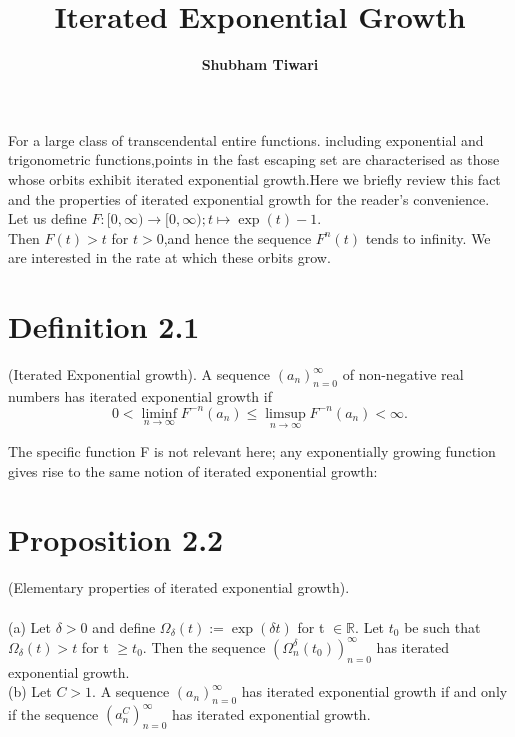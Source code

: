\documentclass{article}
\title{\textbf{Iterated Exponential Growth}}
\author{\textbf{Shubham Tiwari}}
\date{}
\begin{document}
\maketitle
For a large class of transcendental entire functions. including exponential and trigonometric functions,points in the fast escaping set are characterised as those whose orbits exhibit iterated exponential growth.Here we briefly review this fact and the properties of iterated exponential growth for the reader's convenience.\\
\vspace{0.5cm}
Let us define $ F \colon [0,\infty) \to [0,\infty) ; t \mapsto \exp(t) -1$. \\
Then $F(t) > t$ for $t > 0$,and hence the sequence $F^n(t)$ tends to infinity. We are interested in the rate at which these orbits grow.
\section*{Definition 2.1} (Iterated Exponential growth). A sequence $ (a_n)_{n = 0}^ {\infty} $ of non-negative real numbers has iterated exponential growth if 
\[ 0 < \liminf_{n \to \infty} F^{-n} (a_n) \leq \limsup_{n \to \infty} F^{-n} (a_n) < \infty. \]

The specific function F is not relevant here; any exponentially growing function gives rise to the same
notion of iterated exponential growth:

\section*{Proposition 2.2} (Elementary properties of iterated exponential growth).\\ \\
(a) Let  $\delta > 0$ and define $\Omega_\delta(t) := \exp(\delta t) $ for t $ \in \mathbb{R}. $ Let $t_0 $ be such that  $\Omega_\delta(t) > t$ for t $\geq t_0$. Then the sequence $(\Omega_{n}^{\delta}(t_0))_{n=0}^{\infty}$ has iterated exponential growth. \\
(b) Let $ C > 1 $. A sequence $(a_n)_{n=0}^{\infty}$ has iterated exponential growth if and only if the sequence $(a_{n}^{C})_{n=0}^{\infty}$ has iterated exponential growth.
\end{document}

